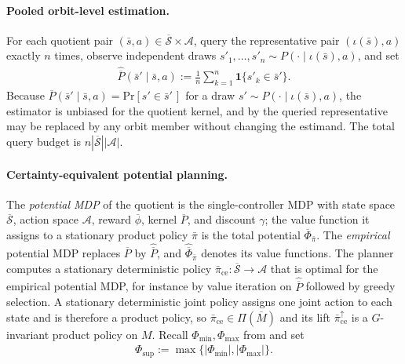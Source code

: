 \documentclass{article}
\theoremstyle{plain}
\theoremstyle{definition}
\theoremstyle{remark}
\renewcommand{\Pr}{\mathrm{Pr}}
\newcommand{\St}{\mathcal{S}}
\newcommand{\Ac}{\mathcal{A}}
\newcommand{\abs}[1]{\left\lvert#1\right\rvert}
\newcommand{\quotient}[1]{\overline{#1}}
\newcommand{\Potbar}{\overline{\Phi}}
\newcommand{\Phisup}{\Phi_{\mathrm{sup}}}
\newcommand{\hatP}{\widehat{\quotient P}}
\newcommand{\hatPot}{\widehat{\Potbar}}
\newcommand{\pice}{\bar\pi_{\mathrm{ce}}}
\begin{document}
\paragraph{Pooled orbit-level estimation.}
For each quotient pair $(\bar s,a)\in\quotient\St\times\Ac$, query the
representative pair $(\iota(\bar s),a)$ exactly $n$ times, observe independent
draws $s'_1,\ldots,s'_n\sim P(\cdot\mid\iota(\bar s),a)$, and set
\begin{align}
  \hatP(\bar s'\mid\bar s,a)
  :=
  \frac1n\sum_{k=1}^n\mathbf 1\{s'_k\in\bar s'\}.
  \label{eq:pooled-estimator}
\end{align}
Because
$\quotient P(\bar s'\mid\bar s,a)=\Pr[s'\in\bar s'\,]$ for a draw
$s'\sim P(\cdot\mid\iota(\bar s),a)$, the estimator is unbiased for the
quotient kernel, and by  the queried
representative may be replaced by any orbit member without changing the
estimand. The total query budget is $n\abs{\quotient\St}\abs\Ac$.

\paragraph{Certainty-equivalent potential planning.}
The \emph{potential MDP} of the quotient is the single-controller MDP with
state space $\quotient\St$, action space $\Ac$, reward $\quotient\phi$, kernel
$\quotient P$, and discount $\gamma$; the value function it assigns to a
stationary product policy $\bar\pi$ is the total potential
$\Potbar_{\bar\pi}$. The \emph{empirical} potential MDP replaces
$\quotient P$ by $\hatP$, and $\hatPot_{\bar\pi}$ denotes its value functions.
The planner computes a stationary deterministic policy
$\pice:\quotient\St\to\Ac$ that is optimal for the empirical potential MDP,
for instance by value iteration on $\hatP$ followed by greedy selection. A
stationary deterministic joint policy assigns one joint action to each state
and is therefore a product policy, so $\pice\in\Pi(\quotient M)$ and its lift
$\pice^\uparrow$ is a $G$-invariant product policy on $M$. Recall
$\Phi_{\min},\Phi_{\max}$ from  and set
\begin{align*}
  \Phisup
  :=
  \max\{\abs{\Phi_{\min}},\abs{\Phi_{\max}}\}.
\end{align*}
\end{document}
